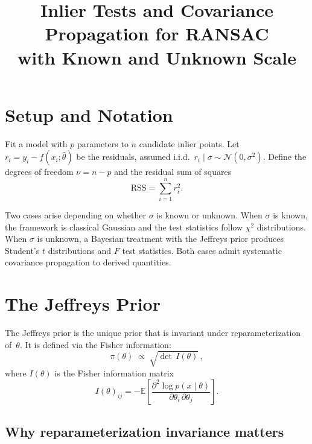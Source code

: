 \documentclass[11pt]{article}
\title{Inlier Tests and Covariance Propagation for RANSAC\\
  with Known and Unknown Scale}
\author{}
\date{}
\newcommand{\Normal}{\mathcal{N}}
\begin{document}
\maketitle

\section{Setup and Notation}

Fit a model with $p$ parameters to $n$ candidate inlier points.
Let $r_i = y_i - f(x_i; \hat\theta)$ be the residuals, assumed i.i.d.\
$r_i \mid \sigma \sim \Normal(0, \sigma^2)$.
Define the degrees of freedom $\nu = n - p$ and the residual sum of squares
\begin{equation}
  \mathrm{RSS} = \sum_{i=1}^{n} r_i^2.
\end{equation}

Two cases arise depending on whether $\sigma$ is known or unknown.
When $\sigma$ is known, the framework is classical Gaussian and the
test statistics follow $\chi^2$ distributions. When $\sigma$ is unknown,
a Bayesian treatment with the Jeffreys prior produces Student's $t$
distributions and $F$ test statistics. Both cases admit systematic
covariance propagation to derived quantities.

\section{The Jeffreys Prior}
\label{sec:jeffreys}

The Jeffreys prior is the unique prior that is invariant under
reparameterization of~$\theta$. It is defined via the Fisher information:
\begin{equation}
  \pi(\theta) \;\propto\; \sqrt{\det\, I(\theta)}\,,
\end{equation}
where $I(\theta)$ is the Fisher information matrix
\begin{equation}
  I(\theta)_{ij}
  = -\mathbb{E}\!\left[
      \frac{\partial^2 \log p(x \mid \theta)}
           {\partial \theta_i \,\partial \theta_j}
    \right].
\end{equation}

\subsection{Why reparameterization invariance matters}
\end{document}
